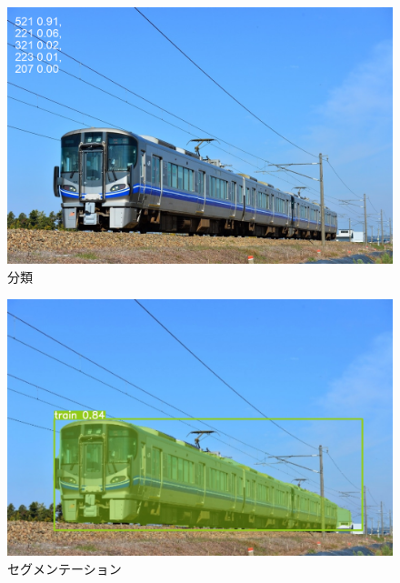 \begin{figure}
		\begin{center}
			\includegraphics[width=200mm]{fig/521_2.png}
		\end{center}
		\caption{分類}
		\label{fig:two}
\end{figure}

\begin{figure}
		\begin{center}
			\includegraphics[width=200mm]{fig/521_seg.png}
		\end{center}
		\caption{セグメンテーション}
		\label{fig:three}
\end{figure}



